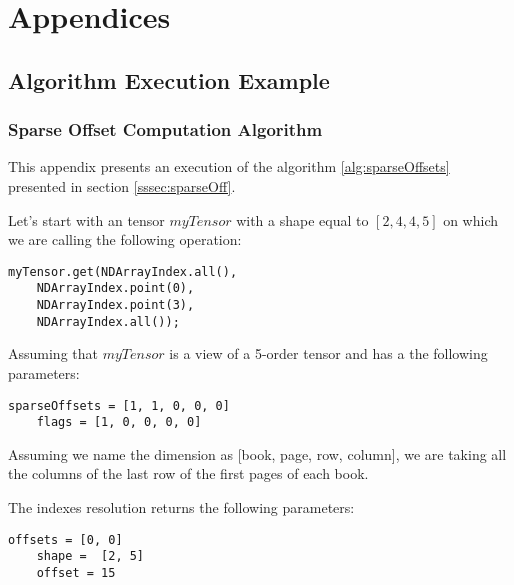 \appendix
\chapter{Appendices}
\section{Algorithm Execution Example}
\subsection{Sparse Offset Computation Algorithm}
\label{ch:spaoffexec}

	This appendix presents an execution of the algorithm \ref{alg:sparseOffsets} presented in section \ref{sssec:sparseOff}.
	
	Let's start with an tensor $myTensor$ with a shape equal to $[2, 4, 4, 5]$ on which we are calling the following operation:
	
	\begin{lstlisting}[style=nonumbers]
	myTensor.get(NDArrayIndex.all(),
	NDArrayIndex.point(0),
	NDArrayIndex.point(3),
	NDArrayIndex.all());
	\end{lstlisting}
	
	Assuming that $myTensor$ is a view of a 5-order tensor and has a the following parameters:
	
	\begin{lstlisting}[style=nonumbers]		
	sparseOffsets = [1, 1, 0, 0, 0]
	flags = [1, 0, 0, 0, 0]
	\end{lstlisting}
	
	Assuming we name the dimension as [book, page, row, column], we are taking all the columns of the last row of the first pages of each book.
	
	The indexes resolution returns the following parameters:
	
	\begin{lstlisting}[style=nonumbers]
	offsets = [0, 0]
	shape =  [2, 5]
	offset = 15
	\end{lstlisting}
	
